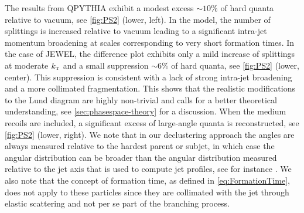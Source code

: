 The results from QPYTHIA exhibit a modest excess $\sim 10\%$ of hard quanta relative to vacuum, see \autoref{fig:PS2} (lower, left). In the model, the number of splittings is increased relative to vacuum leading to a significant intra-jet momentum broadening at scales corresponding to very short formation times.
In the case of JEWEL, the difference plot exhibits only a mild increase of splittings at moderate $k_{\text{\tiny T}}$ and a small suppression $\sim 6\%$ of hard quanta, see \autoref{fig:PS2} (lower, center). This suppression is consistent with a lack of strong intra-jet broadening and a more collimated fragmentation. 
This shows that the realistic modifications to the Lund diagram are highly non-trivial and calls for a better theoretical understanding, see \autoref{sec:phasespace-theory} for a discussion.
When the medium recoils are included, a significant excess of large-angle quanta is reconstructed, see \autoref{fig:PS2} (lower, right). 
We note that in our declustering approach the angles are always measured relative to the hardest parent or subjet, in which case the angular distribution can be broader than the angular distribution measured relative to the jet axis that is used to compute jet profiles, see for instance \cite{KunnawalkamElayavalli:2017hxo}.
We also note that the concept of formation time, as defined in \eqref{eq:FormationTime}, does not apply to these particles since they are collimated with the jet through elastic scattering and not per se part of the branching process.


